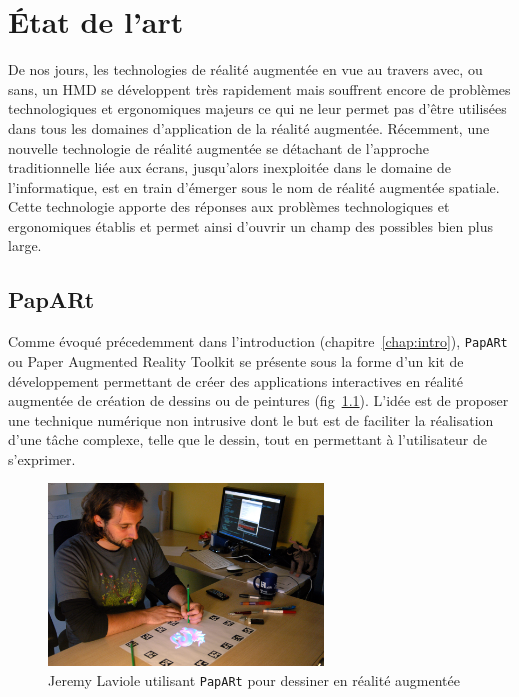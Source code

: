 \chapter{État de l'art}

De nos jours, les technologies de réalité augmentée en vue au travers avec, ou sans, un HMD se développent très rapidement mais souffrent encore de problèmes technologiques et ergonomiques majeurs ce qui ne leur permet pas d'être utilisées dans tous les domaines d'application de la réalité augmentée\cite{li2017state}. 
Récemment, une nouvelle technologie de réalité augmentée se détachant de l'approche traditionnelle liée aux écrans, jusqu'alors inexploitée dans le domaine de l'informatique, est en train d'émerger sous le nom de réalité augmentée spatiale. Cette technologie apporte des réponses aux problèmes technologiques et ergonomiques établis et permet ainsi d'ouvrir un champ des possibles bien plus large\cite{bimber2006modern}.

\section{PapARt}
\label{sec:papart}
Comme évoqué précedemment dans l'introduction (chapitre~\ref{chap:intro}), \texttt{PapARt} ou Paper Augmented Reality Toolkit se présente sous la forme d'un kit de développement permettant de créer des applications interactives en réalité augmentée de création de dessins ou de peintures (fig~\ref{fig:papartdemo}). L'idée est de proposer une technique numérique non intrusive dont le but est de faciliter la réalisation d'une tâche complexe, telle que le dessin, tout en permettant à l'utilisateur de s'exprimer\cite{laviole2012papart}.
\begin{figure}[H]
\centering
\includegraphics[width=0.65\textwidth]{images/papart-demo}
\caption{Jeremy Laviole utilisant \texttt{PapARt} pour dessiner en réalité augmentée\protect\footnotemark}
\label{fig:papartdemo}
\end{figure}

